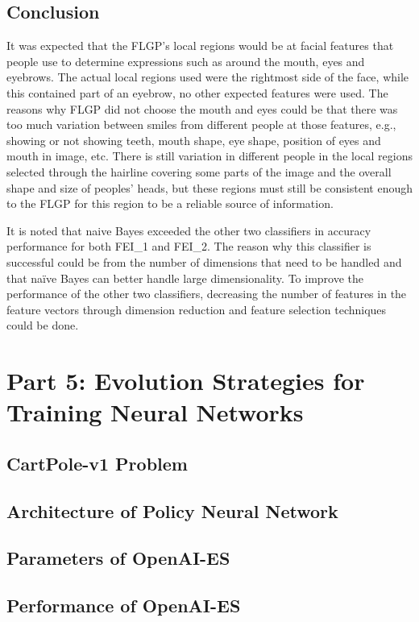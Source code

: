 \documentclass{article}
\begin{document}
\subsection*{Conclusion}
It was expected that the FLGP's local regions would be at facial features that people use to determine expressions such as around the mouth, eyes and eyebrows. The actual local regions used were the rightmost side of the face, while this contained part of an eyebrow, no other expected features were used. The reasons why FLGP did not choose the mouth and eyes could be that there was too much variation between smiles from different people at those features, e.g., showing or not showing teeth, mouth shape, eye shape, position of eyes and mouth in image, etc. There is still variation in different people in the local regions selected through the hairline covering some parts of the image and the overall shape and size of peoples' heads, but these regions must still be consistent enough to the FLGP for this region to be a reliable source of information. \par
\noindent It is noted that naive Bayes exceeded the other two classifiers in accuracy performance for both FEI\_1 and FEI\_2. The reason why this classifier is successful could be from the number of dimensions that need to be handled and that naïve Bayes can better handle large dimensionality. To improve the performance of the other two classifiers, decreasing the number of features in the feature vectors through dimension reduction and feature selection techniques could be done. \par
\section*{Part 5: Evolution Strategies for Training Neural Networks}
\subsection*{CartPole-v1 Problem}
\subsection*{Architecture of Policy Neural Network}
\subsection*{Parameters of OpenAI-ES}
\subsection*{Performance of OpenAI-ES}


\end{document}

